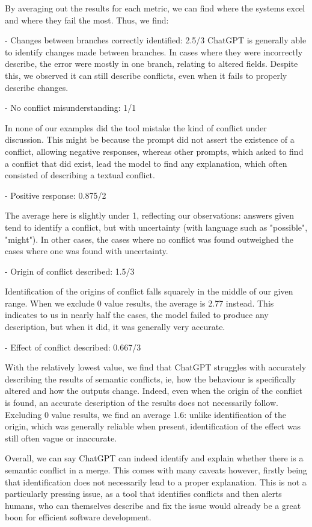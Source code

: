 By averaging out the results for each metric, we can find where the systems excel and where they fail the most. Thus, we find:

- Changes between branches correctly identified: 2.5/3
ChatGPT is generally able to identify changes made between branches. In cases where they were incorrectly describe, the error were mostly in one branch, relating to altered fields. Despite this, we observed it can still describe conflicts, even when it fails to properly describe changes.

- No conflict misunderstanding: 1/1

In none of our examples did the tool mistake the kind of conflict under discussion. This might be because the prompt did not assert the existence of a conflict, allowing negative responses, whereas other prompts, which asked to find a conflict that did exist, lead the model to find any explanation, which often consisted of describing a textual conflict.

- Positive response: 0.875/2

The average here is slightly under 1, reflecting our observations: answers given tend to identify a conflict, but with uncertainty (with language such as "possible", "might"). In other cases, the cases where no conflict was found outweighed the cases where one was found with uncertainty.

- Origin of conflict described: 1.5/3

Identification of the origins of conflict falls squarely in the middle of our given range.  When we exclude 0 value results, the average is 2.77 instead. This indicates to us in nearly half the cases, the model failed to produce any description, but when it did, it was generally very accurate.

- Effect of conflict described: 0.667/3

With the relatively lowest value, we find that ChatGPT struggles with accurately describing the results of semantic conflicts, ie, how the behaviour is specifically altered and how the outputs change. Indeed, even when the origin of the conflict is found, an accurate description of the results does not necessarily follow. Excluding 0 value results, we find an average 1.6: unlike identification of the origin, which was generally reliable when present, identification of the effect was still often vague or inaccurate.


Overall, we can say ChatGPT can indeed identify and explain whether there is a semantic conflict in a merge. This comes with many caveats however, firstly being that identification does not necessarily lead to a proper explanation. This is not a particularly pressing issue, as a tool that identifies conflicts and then alerts humans, who can themselves describe and fix the issue would already be a great boon for efficient software development.

